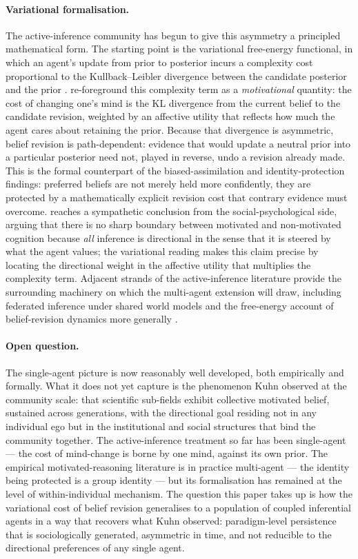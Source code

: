 \paragraph{Variational formalisation.}
The active-inference community has begun to give this asymmetry a
principled mathematical form. The starting point is the variational
free-energy functional, in which an agent's update from prior to
posterior incurs a complexity cost proportional to the
Kullback--Leibler divergence between the candidate posterior and the
prior \citep{Costa2020_4}. \citet{hylandAlbarracin2025MindChange}
re-foreground this complexity term as a \emph{motivational} quantity:
the cost of changing one's mind is the KL divergence from the current
belief to the candidate revision, weighted by an affective utility
that reflects how much the agent cares about retaining the prior.
Because that divergence is asymmetric, belief revision is
path-dependent: evidence that would update a neutral prior into a
particular posterior need not, played in reverse, undo a revision
already made. This is the formal counterpart of the
biased-assimilation and identity-protection findings: preferred
beliefs are not merely held more confidently, they are protected by a
mathematically explicit revision cost that contrary evidence must
overcome. \citet{Kruglanski2020_10} reaches a sympathetic conclusion
from the social-psychological side, arguing that there is no sharp
boundary between motivated and non-motivated cognition because
\emph{all} inference is directional in the sense that it is steered
by what the agent values; the variational reading makes this claim
precise by locating the directional weight in the affective utility
that multiplies the complexity term. Adjacent strands of the
active-inference literature provide the surrounding machinery on
which the multi-agent extension will draw, including federated
inference under shared world models \citep{Friston2023_7} and the
free-energy account of belief-revision dynamics more generally
\citep{Hopkins2016_8}.

\paragraph{Open question.}
The single-agent picture is now reasonably well developed, both
empirically and formally. What it does not yet capture is the
phenomenon Kuhn observed at the community scale: that scientific
sub-fields exhibit collective motivated belief, sustained across
generations, with the directional goal residing not in any individual
ego but in the institutional and social structures that bind the
community together. The active-inference treatment so far has been
single-agent --- the cost of mind-change is borne by one mind, against
its own prior. The empirical motivated-reasoning literature is in
practice multi-agent --- the identity being protected is a group
identity --- but its formalisation has remained at the level of
within-individual mechanism. The question this paper takes up is how
the variational cost of belief revision generalises to a population
of coupled inferential agents in a way that recovers what Kuhn
observed: paradigm-level persistence that is sociologically generated,
asymmetric in time, and not reducible to the directional preferences
of any single agent.
